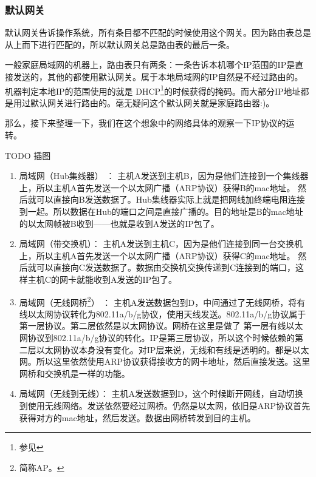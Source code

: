 \begin{insertnote}
\subsubsection{默认网关}

默认网关告诉操作系统，所有条目都不匹配的时候使用这个网关。因为路由表总是从上而下进行匹配的，所以默认网关总是路由表的最后一条。

一般家庭局域网的机器上，路由表只有两条：一条告诉本机哪个IP范围的IP是直接发送的，其他的都使用默认网关。属于本地局域网的IP自然是不经过路由的。机器判定本地IP的范围使用的就是
DHCP\footnote{参见}的时候获得的掩码。而大部分IP地址都是用过默认网关进行路由的。毫无疑问这个默认网关就是家庭路由器:)。

\end{insertnote}

那么，接下来整理一下，我们在这个想象中的网络具体的观察一下IP协议的运转。

TODO 插图

\begin{enumerate}

\item 局域网（Hub集线器） ： 主机A发送到主机B，因为是他们连接到一个集线器上，所以主机A首先发送一个以太网广播（ARP协议）获得B的mac地址。
然后就可以直接向B发送数据了。Hub集线器实际上就是把网线加终端电阻连接到一起。所以数据在Hub的端口之间是直接广播的。目的地址是B的mac地址的以太网帧被B收到——也就是收到A发送的IP包了。

\item 局域网（带交换机）： 主机A发送到主机C，因为是他们连接到同一台交换机上，所以主机A首先发送一个以太网广播（ARP协议）获得C的mac地址。
然后就可以直接向C发送数据了。数据由交换机交换传递到C连接到的端口，这样主机C的网卡就能收到A发送的IP包了。

\item 局域网（无线网桥\footnote{简称AP。}） ： 主机A发送数据包到D，中间通过了无线网桥，将有线以太网协议转化为802.11a/b/g协议，使用天线发送。802.11a/b/g协议属于第一层协议。第二层依然是以太网协议。网桥在这里是做了
第一层有线以太网协议到802.11a/b/g协议的转化。IP是第三层协议，所以这个时候依赖的第二层以太网协议本身没有变化。对IP层来说，无线和有线是透明的。都是以太网。所以这里依然使用ARP协议获得接收方的网卡地址，然后直接发送。这里网桥和交换机是一样的功能。

\item 局域网（无线到无线）： 主机A发送数据到D，这个时候断开网线，自动切换到使用无线网络。发送依然要经过网桥。仍然是以太网，依旧是ARP协议首先获得对方的mac地址，然后发送。数据由网桥转发到目的主机。

\end{enumerate}

